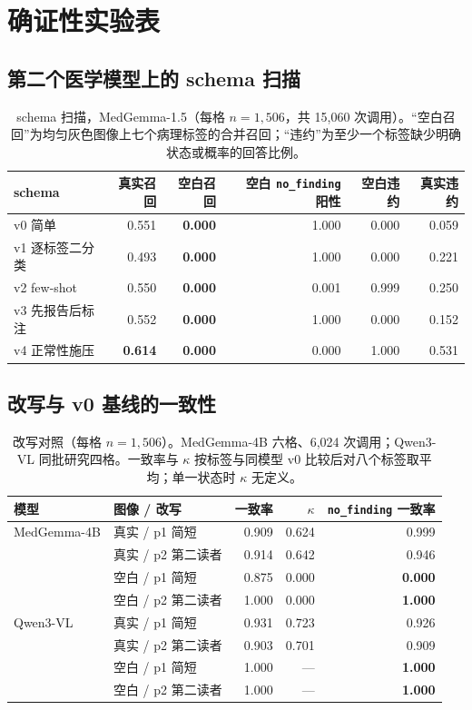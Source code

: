 \section{确证性实验表}
\label{app:round2}

\subsection*{第二个医学模型上的 schema 扫描}

\begin{table}[t]
\centering
\footnotesize
\setlength{\tabcolsep}{3.5pt}
\caption{schema 扫描，MedGemma-1.5（每格 $n=1{,}506$，共 15,060 次调用）。``空白召回''为均匀灰色图像上七个病理标签的合并召回；``违约''为至少一个标签缺少明确状态或概率的回答比例。}
\label{tab:r2schema}
\begin{tabular}{lrrrrr}
\toprule
schema & 真实召回 & 空白召回 & 空白 \texttt{no\_finding} 阳性 & 空白违约 & 真实违约 \\
\midrule
v0 简单 & 0.551 & \textbf{0.000} & 1.000 & 0.000 & 0.059 \\
v1 逐标签二分类 & 0.493 & \textbf{0.000} & 1.000 & 0.000 & 0.221 \\
v2 few-shot & 0.550 & \textbf{0.000} & 0.001 & 0.999 & 0.250 \\
v3 先报告后标注 & 0.552 & \textbf{0.000} & 1.000 & 0.000 & 0.152 \\
v4 正常性施压 & \textbf{0.614} & \textbf{0.000} & 0.000 & 1.000 & 0.531 \\
\bottomrule
\end{tabular}
\end{table}

\subsection*{改写与 v0 基线的一致性}

\begin{table}[H]
\centering
\footnotesize
\setlength{\tabcolsep}{3pt}
\caption{改写对照（每格 $n=1{,}506$）。MedGemma-4B 六格、6,024 次调用；Qwen3-VL 同批研究四格。一致率与 $\kappa$ 按标签与同模型 v0 比较后对八个标签取平均；单一状态时 $\kappa$ 无定义。}
\label{tab:r2para}
\begin{tabular}{llrrr}
\toprule
模型 & 图像 / 改写 & 一致率 & $\kappa$ & \texttt{no\_finding} 一致率 \\
\midrule
MedGemma-4B & 真实 / p1 简短 & 0.909 & 0.624 & 0.999 \\
 & 真实 / p2 第二读者 & 0.914 & 0.642 & 0.946 \\
 & 空白 / p1 简短 & 0.875 & 0.000 & \textbf{0.000} \\
 & 空白 / p2 第二读者 & 1.000 & 0.000 & \textbf{1.000} \\
\midrule
Qwen3-VL & 真实 / p1 简短 & 0.931 & 0.723 & 0.926 \\
 & 真实 / p2 第二读者 & 0.903 & 0.701 & 0.909 \\
 & 空白 / p1 简短 & 1.000 & --- & \textbf{1.000} \\
 & 空白 / p2 第二读者 & 1.000 & --- & \textbf{1.000} \\
\bottomrule
\end{tabular}
\end{table}

